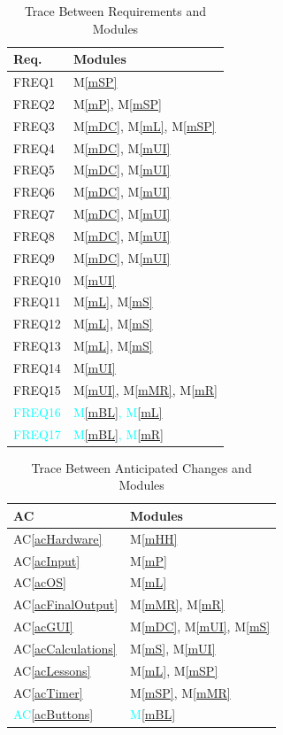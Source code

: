 \documentclass[12pt, titlepage]{article}
\newcommand{\acref}[1]{AC\ref{#1}}
\newcommand{\mref}[1]{M\ref{#1}}
\begin{document}
\begin{table}[H]
\centering
\begin{tabular}{p{} p{}}
\toprule
\textbf{Req.} & \textbf{Modules}\\
\midrule
FREQ1 & \mref{mSP}\\
FREQ2 & \mref{mP}, \mref{mSP}\\
FREQ3 & \mref{mDC}, \mref{mL}, \mref{mSP}\\
FREQ4 & \mref{mDC}, \mref{mUI}\\
FREQ5 & \mref{mDC}, \mref{mUI}\\
FREQ6 & \mref{mDC}, \mref{mUI}\\
FREQ7 & \mref{mDC}, \mref{mUI}\\
FREQ8 & \mref{mDC}, \mref{mUI}\\
FREQ9 & \mref{mDC}, \mref{mUI}\\
FREQ10 & \mref{mUI}\\
FREQ11 & \mref{mL}, \mref{mS}\\
FREQ12 & \mref{mL}, \mref{mS}\\
FREQ13 & \mref{mL}, \mref{mS}\\
FREQ14 & \mref{mUI}\\
FREQ15 & \mref{mUI}, \mref{mMR}, \mref{mR}\\
\textcolor{cyan}{FREQ16} & \textcolor{cyan}{\mref{mBL}, \mref{mL}}\\
\textcolor{cyan}{FREQ17} & \textcolor{cyan}{\mref{mBL}, \mref{mR}}\\
\bottomrule
\end{tabular}
\caption{Trace Between Requirements and Modules}
\label{TblRT}
\end{table}


\begin{table}[H]
\centering
\begin{tabular}{p{} p{}}
\toprule
\textbf{AC} & \textbf{Modules}\\
\midrule
\acref{acHardware} & \mref{mHH}\\
\acref{acInput} & \mref{mP}\\
\acref{acOS} & \mref{mL}\\
\acref{acFinalOutput} & \mref{mMR}, \mref{mR}\\
\acref{acGUI} & \mref{mDC}, \mref{mUI}, \mref{mS}\\
\acref{acCalculations} & \mref{mS}, \mref{mUI}\\
\acref{acLessons} & \mref{mL}, \mref{mSP} \\
\acref{acTimer} & \mref{mSP}, \mref{mMR}\\
\textcolor{cyan}{\acref{acButtons}} & \textcolor{cyan}{\mref{mBL}}\\
\bottomrule
\end{tabular}
\caption{Trace Between Anticipated Changes and Modules}
\label{TblACT}
\end{table}
\end{document}
